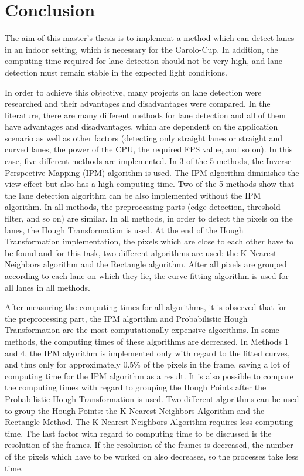 %
\chapter{Conclusion}\label{cha:Conclusion}
%

The aim of this master's thesis is to implement a method which can detect lanes in an indoor setting, which is necessary for the Carolo-Cup. In addition, the computing time required for lane detection should not be very high, and lane detection must remain stable in the expected light conditions.

In order to achieve this objective, many projects on lane detection were researched and their advantages and disadvantages were compared. In the literature, there are many different methods for lane detection and all of them have advantages and disadvantages, which are dependent on the application scenario as well as other factors (detecting only straight lanes or straight and curved lanes, the power of the CPU, the required FPS value, and so on). In this case, five different methods are implemented. In 3 of the 5 methods, the Inverse Perspective Mapping (IPM) algorithm is used. The IPM algorithm diminishes the view effect but also has a high computing time. Two of the 5 methods show that the lane detection algorithm can be also implemented without the IPM algorithm. In all methods, the preprocessing parts (edge detection, threshold filter, and so on) are similar. In all methods, in order to detect the pixels on the lanes, the Hough Transformation is used. At the end of the Hough Transformation implementation, the pixels which are close to each other have to be found and for this task, two different algorithms are used: the K-Nearest Neighbors algorithm and the Rectangle algorithm. After all pixels are grouped according to each lane on which they lie, the curve fitting algorithm is used for all lanes in all methods.

After measuring the computing times for all algorithms, it is observed that for the preprocessing part, the IPM algorithm and Probabilistic Hough Transformation are the most computationally expensive algorithms. In some methods, the computing times of these algorithms are decreased. In Methods 1 and 4, the IPM algorithm is implemented only with regard to the fitted curves, and thus only for approximately 0.5\% of the pixels in the frame, saving a lot of computing time for the IPM algorithm as a result. It is also possible to compare the computing times with regard to grouping the Hough Points after the Probabilistic Hough Transformation is used. Two different algorithms can be used to group the Hough Points: the K-Nearest Neighbors Algorithm and the Rectangle Method. The K-Nearest Neighbors Algorithm requires less computing time. The last factor with regard to computing time to be discussed is the resolution of the frames. If the resolution of the frames is decreased, the number of the pixels which have to be worked on also decreases, so the processes take less time.